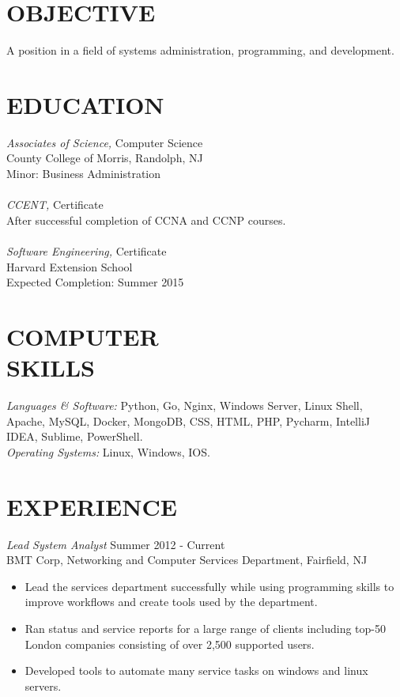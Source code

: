 \documentclass[line,margin]{res}
\begin{document}
\address{265  Main Road, Montville, NJ 07045 - 862-345-8316}
\address{github.com/odonnellryan - odonnellryanc@gmail.com}

\begin{resume}

\section{OBJECTIVE}	A position in a field of systems administration, programming, and development.

\section{EDUCATION} {\sl Associates of Science,} Computer Science \\
		County College of Morris, Randolph, NJ  \\
	 	Minor: Business Administration \\ \\
	{\sl CCENT,} Certificate \\
		After successful completion of CCNA and CCNP courses. \\ \\
	{\sl Software Engineering,} Certificate \\
		Harvard Extension School \\
		Expected Completion: Summer 2015

\section{COMPUTER \\ SKILLS} {\sl Languages \& Software:} Python, Go,
	Nginx, Windows Server, Linux Shell, Apache, MySQL, Docker, MongoDB, CSS, HTML, PHP,
	Pycharm, IntelliJ IDEA, Sublime, PowerShell. \\
	{\sl Operating Systems:} Linux, Windows, IOS.

\section{EXPERIENCE} {\sl Lead System Analyst} \hfill Summer 2012  - Current\\
	BMT Corp, Networking and Computer Services Department, Fairfield, NJ
	\begin{itemize}  \itemsep -2pt
		\item Lead the services department successfully while using programming skills to improve
			workflows and create tools used by the department.
		\item Ran status and service reports for a large range of clients including top-50
			London companies consisting of over 2,500 supported users.
		\item   Developed tools to automate many service tasks on windows and linux servers.
	\end{itemize}


\end{resume}
\end{document}
